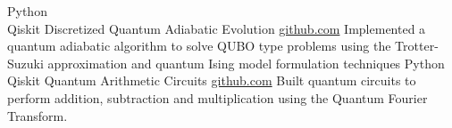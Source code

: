 \documentclass[9pt]{developercv} %
\begin{document}
\begin{entrylist}
	\entry
		{Python \\ Qiskit}
		{Discretized Quantum Adiabatic Evolution}
		{\href{https://github.com/lonelyneutrin0/Adiabatic-Quantum-Computation}{github.com}}
		{Implemented a quantum adiabatic algorithm to solve QUBO type problems using the Trotter-Suzuki approximation and quantum Ising model formulation techniques}
	\entry 
		{Python \\ Qiskit}
		{Quantum Arithmetic Circuits}
		{\href{https://github.com/lonelyneutrin0/Quantum-Arithmetic-Circuits}{github.com}}	
		{Built quantum circuits to perform addition, subtraction and multiplication using the Quantum Fourier Transform.}	
	

\end{entrylist}
\end{document}
